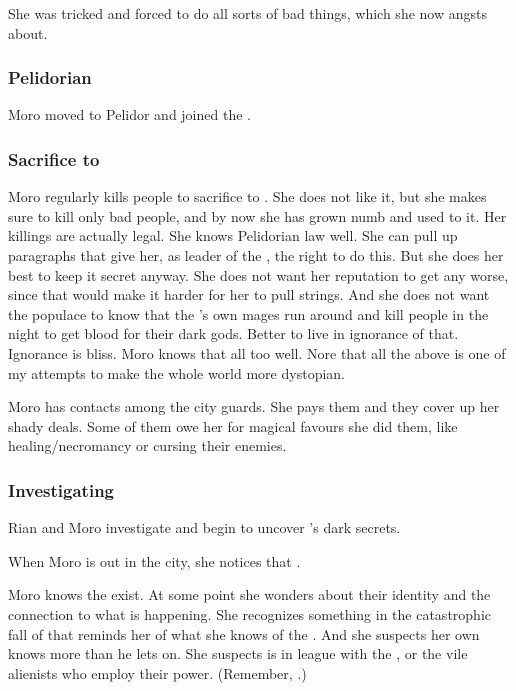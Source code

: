 She was tricked and forced to do all sorts of bad things, which she now angsts about.





\subsubsection{Pelidorian \ishrah}
Moro moved to Pelidor and joined the \ishrah. 





\subsubsection{Sacrifice to \Nasshikerr}
Moro regularly kills people to sacrifice to .
She does not like it, but she makes sure to kill only bad people, and by now she has grown numb and used to it.
Her killings are actually legal.
She knows Pelidorian law well. 
She can pull up paragraphs that give her, as leader of the \ishrah, the right to do this.
But she does her best to keep it secret anyway.
She does not want her reputation to get any worse, since that would make it harder for her to pull strings.
And she does not want the populace to know that the \rayuth's own \ishrah mages run around and kill people in the night to get blood for their dark gods.
Better to live in ignorance of that.
Ignorance is bliss.
Moro knows that all too well.
Nore that all the above is one of my attempts to make the whole world more dystopian.

Moro has contacts among the city guards.
She pays them and they cover up her shady deals.
Some of them owe her for magical favours she did them, like healing/necromancy or cursing their enemies.





\subsubsection{Investigating \Malcur}
Rian and Moro investigate and begin to uncover \Malcur's dark secrets. 

When Moro is out in the city, she notices that . 

Moro \Cornel knows the \xs exist. 
At some point she wonders about their identity and the connection to what is happening.
She recognizes something in the catastrophic fall of \Malcur that reminds her of what she knows of the \xs.
And she suspects her own \Nasshikerr knows more than he lets on. 
She suspects \Nasshikerr is in league with the \xs, or the vile alienists who employ their power.
(Remember, .)






